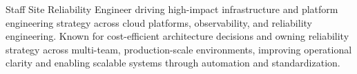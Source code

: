 

\begin{cvparagraph}

Staff Site Reliability Engineer driving high-impact infrastructure and platform engineering strategy across cloud platforms, observability, and reliability engineering. Known for cost-efficient architecture decisions and owning reliability strategy across multi-team, production-scale environments, improving operational clarity and enabling scalable systems through automation and standardization.
\end{cvparagraph}
